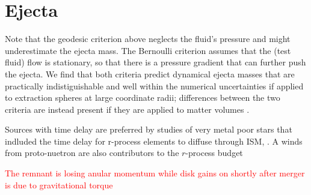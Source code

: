 \documentclass[11pt,a4paper,headinclude=true,DIV=14,BCOR=8mm,chapterprefix,listof=totoc,twoside,openright,abstracton]{scrbook}
\newcommand{\red}[1]{\textcolor{red}{#1}}
\begin{document}
\section{Ejecta}

Note that the geodesic criterion above neglects the fluid's pressure and might
underestimate the ejecta mass. The Bernoulli criterion assumes that the (test
fluid) flow is stationary, so that there is a pressure gradient that can
further push the ejecta.  We find that both criteria predict dynamical
ejecta masses that are practically indistiguishable and well within the numerical uncertainties \citep{Bernuzzi:2020txg} if applied to extraction spheres at large coordinate radii; 
differences between the two criteria are instead present if they are applied to
matter volumes \citep[cf.][]{Kastaun:2014fna}.





Sources with time delay are preferred by studies of very metal poor stars that indluded the time delay for r-process elements
to diffuse through ISM, \citep{Tarumi:2021xvw}. 
A winds from proto-nuetron are also contributors to the $r$-process budget \cite{Vincenzo:2021rvw}

\red{The remnant is losing anular momentum while disk gains on shortly after merger is due to gravitational torque \cite{Shibata:2019wef}}

 
\appendix






\backmatter



\end{document}
